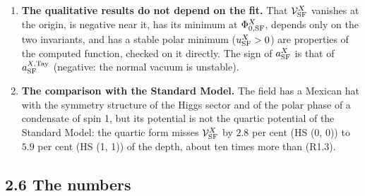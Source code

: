 \documentclass[
  10pt,
]{article}
\begin{document}
\begin{enumerate}
  program finds the same value to \(4\times10^{-11}\) (\emph{check
  YP3-10}). \(b^X_{\rm SF}\) and \(c^X_{\rm SF}\) change with the fitted
  interval and with the number of powers: for CJT,
  \(10^3c^{\rm CJT}_{\rm SF}\) is \(16.34\), \(19.94\) and \(23.62\)
  when (R1.3) is fitted on \([0,\Phi^X_{0,{\rm SF}}]\), on
  \([0,1.4\Phi^X_{0,{\rm SF}}]\) and on the whole computed curve, and
  \(11.61\) when the power \(\Phi^8\) is added (rows 13 to 15 and 18).
  No physical meaning may be given to \(b^X_{\rm SF}\) or
  \(c^X_{\rm SF}\) alone, and methods may be compared through them only
  within the accuracy of the fit. The physical quantities are those that
  the computed function defines: \(\Phi^X_{0,{\rm SF}}\), the depth, the
  curvatures at the minimum, and \(a^{X,{\rm Tay}}_{\rm SF}\).
\item
  \textbf{The qualitative results do not depend on the fit.} That
  \(\mathcal V^X_{\rm SF}\) vanishes at the origin, is negative near it,
  has its minimum at \(\Phi^X_{0,{\rm SF}}\), depends only on the two
  invariants, and has a stable polar minimum (\(u^X_{\rm SF}>0\)) are
  properties of the computed function, checked on it directly. The sign
  of \(a^X_{\rm SF}\) is that of \(a^{X,{\rm Tay}}_{\rm SF}\) (negative:
  the normal vacuum is unstable).
\item
  \textbf{The comparison with the Standard Model.} The field has a
  Mexican hat with the symmetry structure of the Higgs sector and of the
  polar phase of a condensate of spin 1, but its potential is not the
  quartic potential of the Standard Model: the quartic form misses
  \(\mathcal V^X_{\rm SF}\) by \(2.8\) per cent (HS (0, 0)) to \(5.9\)
  per cent (HS (1, 1)) of the depth, about ten times more than (R1.3).
\end{enumerate}

\hypertarget{the-numbers}{%
\subsection{2.6 The numbers}\label{the-numbers}}
\end{document}
